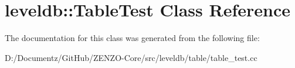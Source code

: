 \hypertarget{classleveldb_1_1_table_test}{}\section{leveldb\+::Table\+Test Class Reference}
\label{classleveldb_1_1_table_test}


The documentation for this class was generated from the following file\+:\begin{DoxyCompactItemize}
\item 
D\+:/\+Documentz/\+Git\+Hub/\+Z\+E\+N\+Z\+O-\/\+Core/src/leveldb/table/table\+\_\+test.\+cc\end{DoxyCompactItemize}
